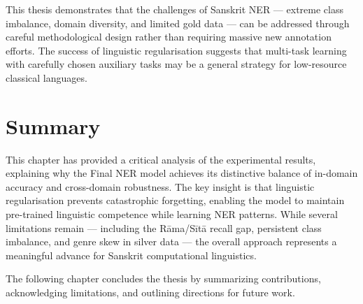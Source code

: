 This thesis demonstrates that the challenges of Sanskrit NER — extreme class imbalance, domain diversity, and limited gold data — can be addressed through careful methodological design rather than requiring massive new annotation efforts. The success of linguistic regularisation suggests that multi-task learning \cite{caruana1997multitask} with carefully chosen auxiliary tasks may be a general strategy for low-resource classical languages.

\section{Summary}

This chapter has provided a critical analysis of the experimental results, explaining why the Final NER model achieves its distinctive balance of in-domain accuracy and cross-domain robustness. The key insight is that linguistic regularisation prevents catastrophic forgetting, enabling the model to maintain pre-trained linguistic competence while learning NER patterns. While several limitations remain — including the Rāma/Sītā recall gap, persistent class imbalance, and genre skew in silver data — the overall approach represents a meaningful advance for Sanskrit computational linguistics.

The following chapter concludes the thesis by summarizing contributions, acknowledging limitations, and outlining directions for future work.

